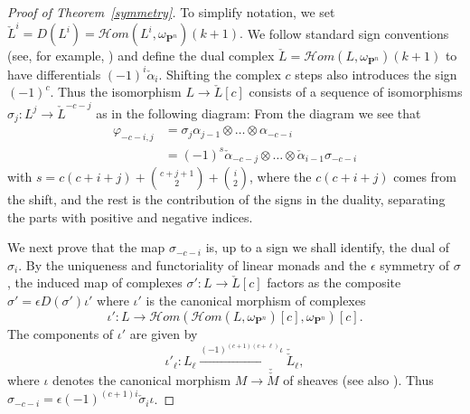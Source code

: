 \documentclass{jams-l}
\theoremstyle{definition}
\theoremstyle{remark}
\newcommand{\cH}{{\mathcal H}}
\newcommand{\PP}{{\mathbf P}}
\newcommand{\tensor}{\otimes}
\newcommand{\rTo}{\xrightarrow}
\newcommand{\rTox}{\rightarrow}
\begin{document}
\begin{proof}[Proof of Theorem~\ref{symmetry}]
To simplify notation, we set
$\check L^i = D(L^i)= \cH om(L^i,\omega_{\PP^n})(k+1).$
We follow standard sign conventions (see, for example,
\cite{Iverson 1986})
and define the dual complex 
$\check L = \cH om(L,\omega_{\PP^n})(k+1)$ to 
have differentials $(-1)^i\check\alpha_i$. Shifting the 
complex $c$ steps also introduces the sign $(-1)^c$. 
Thus the isomorphism $L\to \check L[c]$ consists of 
a sequence of isomorphisms $\sigma_j: L^j\to \check L^{-c-j}$
as in the following diagram:
{}
From the diagram we see that
\begin{equation}
\begin{split}
\varphi_{-c-i,j} &= \sigma_j \alpha_{j-1} \tensor \ldots \tensor 
\alpha_{-c-i} \\
&=(-1)^s \check \alpha_{-c-j} \tensor \ldots 
\tensor \check \alpha_{i-1}\sigma_{-c-i}
\end{split}\tag{$*$}
\end{equation}
with $s=c(c+i+j)+{c+j+1 \choose 2}+{i \choose 2}$,
where the $c(c+i+j)$ comes from the shift, and the rest
is the contribution of the signs in the duality, separating
the parts with positive and negative indices.

We next prove that the map $\sigma_{-c-i}$ is, up to a sign
we shall identify,
the dual of $\sigma_i$. By the uniqueness and functoriality
of linear monads and the $\epsilon$ symmetry
of $\sigma$, the induced map of complexes $\sigma': L\to \check L[c]$
factors as the composite $\sigma' = \epsilon D(\sigma') \iota'$
where $\iota'$ is 
the canonical morphism of complexes
\[
\iota': L \rTox \cH om(\cH om(L,\omega_{\PP^n})[c],\omega_{\PP^n})[c].
\]
The components of $\iota'$ are given by
\[
\iota'_\ell: L_\ell \rTo{(-1)^{(c+1)(c+\ell)} \iota } \check {\check L}_\ell,
\]
where $\iota$ denotes the canonical morphism $M \rTox \check {\check M}$
 of sheaves (see also \cite[p.\ 73]{Iverson 1986}). Thus
$\sigma_{-c-i}= 
\epsilon (-1)^{(c+1)i} \check \sigma_i \iota$.


\end{proof}
\end{document}
